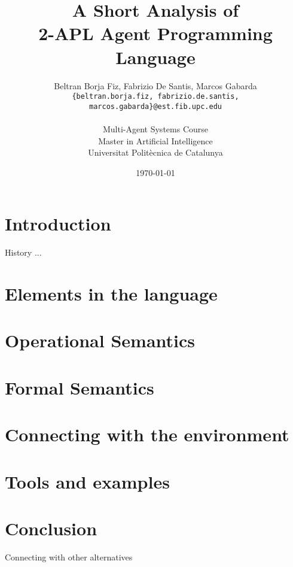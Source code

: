 \documentclass[a4paper]{article}
\begin{document}
\title{A Short Analysis of\\ 2-APL Agent Programming Language}
 
\author{Beltran Borja Fiz, Fabrizio De Santis, Marcos Gabarda\\
\small \texttt{\{beltran.borja.fiz, fabrizio.de.santis, marcos.gabarda\}@est.fib.upc.edu}\\
\\
Multi-Agent Systems Course\\
Master in Artificial Intelligence\\
Universitat Polit\`ecnica de Catalunya}
\date{\today}

\maketitle

\tableofcontents

\section{Introduction}

History ...

\section{Elements in the language}

\section{Operational Semantics}

\section{Formal Semantics}

\section{Connecting with the environment}

\section{Tools and examples}

\section{Conclusion}

Connecting with other alternatives
\end{document}
